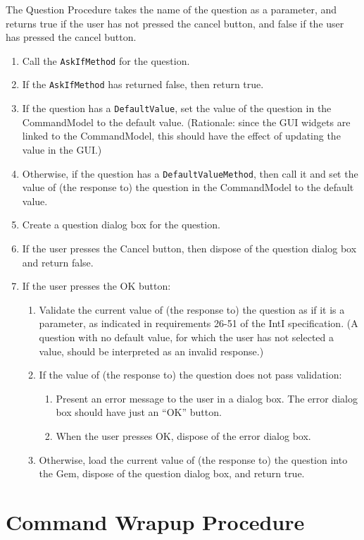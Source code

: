 \documentclass[11pt]{article}
\begin{document}
The Question Procedure takes the name of the question as a parameter,
and returns true if the user has not pressed the cancel button,
and false if the user has pressed the cancel button.
\begin{enumerate}
\item Call the {\tt AskIfMethod} for the question.
\item If the {\tt AskIfMethod} has returned false, then return true.
\item If the question  has a {\tt DefaultValue}, set the value of the
  question in the CommandModel to the default value.
  (Rationale:  since the GUI widgets are linked to the CommandModel,
  this should have the effect of updating the value in the GUI.)
\item Otherwise, if the question has a {\tt DefaultValueMethod}, then call it
  and set the value of (the response to) the question in the CommandModel to
  the default value.
\item Create a question dialog box for the question.
\item If the user presses the Cancel button, then dispose of the
  question dialog box and return false.
\item If the user presses the OK button:
  \begin{enumerate}
  \item Validate the current value of (the response to)
    the question as if it is a
    parameter, as indicated in requirements 26-51 of the IntI
    specification.  (A question with no default value, for which
    the user has not selected a value, should be interpreted as
    an invalid response.)
  \item If the value of (the response to) the question does not pass
    validation:
    \begin{enumerate}
    \item Present an error message to the user in a dialog box.
      The error dialog box should have just an ``OK'' button.
    \item When the user presses OK, dispose of the error dialog box.
    \end{enumerate}
  \item Otherwise, load the current value of (the response to) the question
    into the Gem, dispose of the question dialog box, and return true.
  \end{enumerate}
\end{enumerate}

\section{Command Wrapup Procedure}
\end{document}
